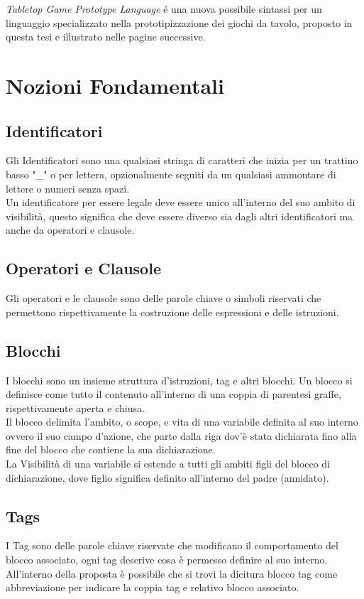 \textit{Tabletop Game Prototype Language} é una nuova possibile sintassi 
per un linguaggio specializzato nella prototipizzazione dei giochi da tavolo,
proposto in questa tesi e illustrato nelle pagine successive.

\section{Nozioni Fondamentali}

\subsection{Identificatori}
Gli Identificatori sono una qualsiasi stringa di caratteri che inizia per un trattino basso "\_" o 
per lettera, opzionalmente seguiti da un qualsiasi ammontare di lettere o numeri senza spazi. \\
Un identificatore per essere legale deve essere unico all'interno del suo ambito di visibilità,
questo significa che deve essere diverso sia dagli altri identificatori ma anche da operatori e clausole.  

\subsection{Operatori e Clausole}
Gli operatori e le clausole sono delle parole chiave o simboli riservati che permettono rispettivamente
la costruzione delle espressioni e delle istruzioni.

\subsection{Blocchi}
I blocchi sono un insieme struttura d'istruzioni, tag e altri blocchi.
Un blocco si definisce come tutto il contenuto all'interno di una coppia di parentesi graffe,
rispettivamente aperta e chiusa. 
\\
Il blocco delimita l'ambito, o scope, e vita di una variabile definita al suo interno ovvero
il suo campo d'azione, che parte dalla riga dov'è stata dichiarata fino alla fine del blocco 
che contiene la sua dichiarazione.
\\
La Visibilità di una variabile si estende a tutti gli ambiti figli del blocco di dichiarazione, 
dove figlio significa definito all'interno del padre (annidato).
 
\subsection{Tags}
I Tag sono delle parole chiave riservate che modificano il comportamento del blocco associato, 
ogni tag descrive cosa è permesso definire al suo interno. \\
All'interno della proposta è possibile che si trovi la dicitura blocco tag come abbreviazione
per indicare la coppia tag e relativo blocco associato.
 
